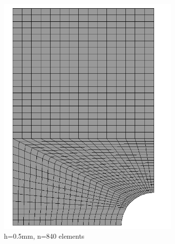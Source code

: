 \documentclass[a4paper,12pt,twoside]{report}
\begin{document}
\begin{figure}[htbp!]
\begin{subfigure}{0.27\textwidth}
         \includegraphics[width=1.27\textwidth]{25.0.5mm2.png}
         \caption{h=0.5mm, n=840 elements}
         \label{fig:0.5mm}
     \end{subfigure}
     \hfill
     \begin{subfigure}{0.27\textwidth}

\end{subfigure}
\end{figure}
\end{document}
